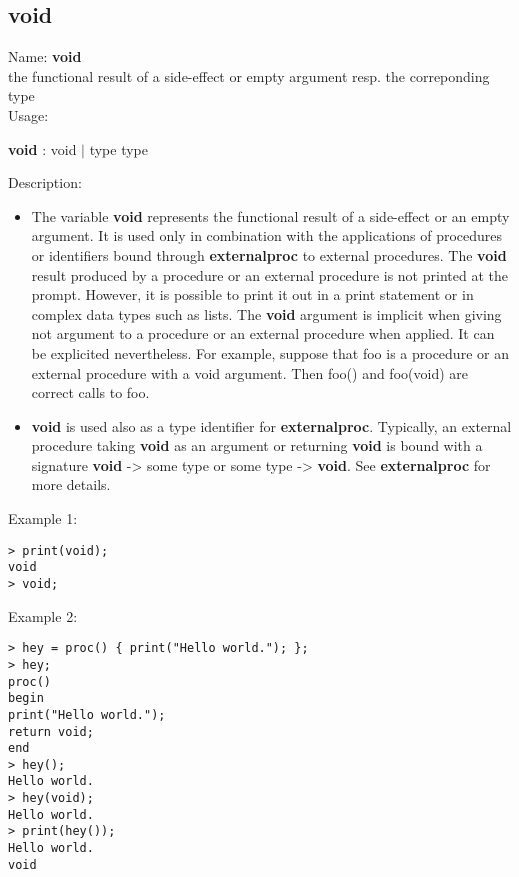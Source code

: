 \subsection{ void }
\noindent Name: \textbf{void}\\
the functional result of a side-effect or empty argument resp. the correponding type\\

\noindent Usage: 
\begin{center}
\textbf{void} : \textsf{void} $|$ \textsf{type type}\\
\end{center}
\noindent Description: \begin{itemize}

\item The variable \textbf{void} represents the functional result of a
   side-effect or an empty argument.  It is used only in combination with
   the applications of procedures or identifiers bound through
   \textbf{externalproc} to external procedures.
   The \textbf{void} result produced by a procedure or an external procedure
   is not printed at the prompt. However, it is possible to print it out
   in a print statement or in complex data types such as lists.
   The \textbf{void} argument is implicit when giving not argument to a
   procedure or an external procedure when applied. It can be explicited
   nevertheless.  For example, suppose that foo is a procedure or an
   external procedure with a void argument. Then foo() and foo(void) are
   correct calls to foo.

\item \textbf{void} is used also as a type identifier for
   \textbf{externalproc}. Typically, an external procedure taking \textbf{void} as an
   argument or returning \textbf{void} is bound with a signature \textbf{void} ->
   some type or some type -> \textbf{void}.  See \textbf{externalproc} for more
   details.
\end{itemize}
\noindent Example 1: 
\begin{center}\begin{minipage}{14.8cm}\begin{Verbatim}[frame=single]
> print(void);
void
> void;
\end{Verbatim}
\end{minipage}\end{center}
\noindent Example 2: 
\begin{center}\begin{minipage}{14.8cm}\begin{Verbatim}[frame=single]
> hey = proc() { print("Hello world."); };
> hey;
proc()
begin
print("Hello world.");
return void;
end
> hey();
Hello world.
> hey(void);
Hello world.
> print(hey());
Hello world.
void
\end{Verbatim}
\end{minipage}\end{center}

